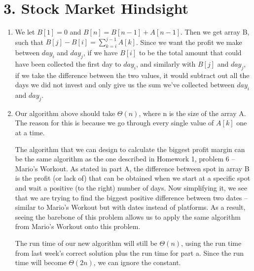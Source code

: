 \documentclass[11pt]{article}
\newenvironment{qparts}{\begin{enumerate}[{(}a{)}]}{\end{enumerate}}
\begin{document}
\newpage
\section*{3. Stock Market Hindsight}
\begin{qparts}
\item
We let $B[1] = 0$ and $B[n] = B[n-1] + A[n-1]$. Then we get array B, such that $B[j] - B[i] = \sum_{k=i}^{j-1} A[k]$. Since we want the profit we make between $day_i$ and $day_j$, if we have $B[i]$ to be the total amount that could have been collected the first day to $day_i$, and similarly with $B[j]$ and $day_j$, if we take the difference between the two values, it would subtract out all the days we did not invest and only give us the sum we've collected between $day_i$ and $day_j$.

\item
Our algorithm above should take $\Theta(n)$, where n is the size of the array A. The reason for this is because we go through every single value of $A[k]$ one at a time. 

The algorithm that we can design to calculate the biggest profit margin can be the same algorithm as the one described in Homework 1, problem 6 -- Mario's Workout. As stated in part A, the difference between spot in array B is the profit (or lack of) that can be obtained when we start at a specific spot and wait a positive (to the right) number of days. Now simplifying it, we see that we are trying to find the biggest positive difference between two dates -- similar to Mario's Workout but with dates instead of platforms. As a result, seeing the barebone of this problem allows us to apply the same algorithm from Mario's Workout onto this problem. 

The run time of our new algorithm will still be $\Theta(n)$, using the run time from last week's correct solution plus the run time for part a. Since the run time will become $\Theta(2n)$, we can ignore the constant. 
\end{qparts}


\newpage
\end{document}
